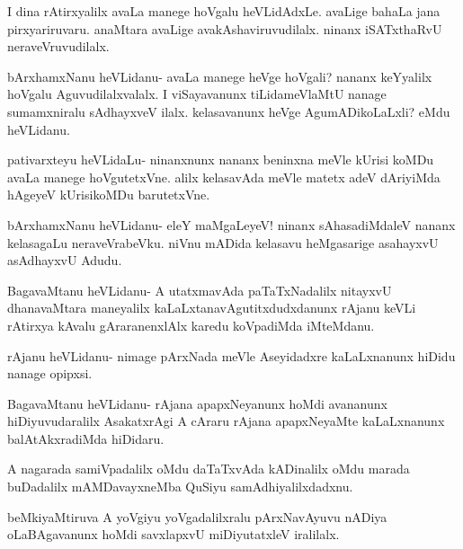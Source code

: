 \documentclass{article}
\begin{document}
\begin{mng}%
I dina rAtirxyalilx avaLa manege hoVgalu heVLidAdxLe. avaLige
bahaLa jana pirxyariruvaru. anaMtara avaLige avakAshaviruvudilalx. ninanx
iSATxthaRvU neraveVruvudilalx.
\end{mng}

\begin{mng}%
bArxhamxNanu heVLidanu- avaLa manege heVge hoVgali? nananx
keYyalilx hoVgalu Aguvudilalxvalalx. I viSayavanunx tiLidameVlaMtU nanage
sumamxniralu sAdhayxveV ilalx. kelasavanunx heVge AgumADikoLaLxli? eMdu
heVLidanu.
\end{mng}

\begin{mng}%
pativarxteyu heVLidaLu- ninanxnunx nananx beninxna meVle kUrisi
koMDu avaLa manege hoVgutetxVne. alilx kelasavAda meVle matetx
adeV dAriyiMda hAgeyeV kUrisikoMDu barutetxVne.
\end{mng}

\begin{mng}%
bArxhamxNanu heVLidanu- eleY maMgaLeyeV! ninanx sAhasadiMdaleV
nananx kelasagaLu neraveVrabeVku. niVnu mADida kelasavu heMgasarige
asahayxvU asAdhayxvU Adudu.
\end{mng}

\begin{mng}%
BagavaMtanu heVLidanu- A utatxmavAda paTaTxNadalilx nitayxvU
dhanavaMtara maneyalilx kaLaLxtanavAgutitxdudxdanunx rAjanu keVLi rAtirxya kAvalu
gAraranenxlAlx karedu koVpadiMda iMteMdanu.
\end{mng}

\begin{mng}%
rAjanu heVLidanu- nimage pArxNada meVle Aseyidadxre kaLaLxnanunx
hiDidu nanage opipxsi.
\end{mng}

\begin{mng}%
BagavaMtanu heVLidanu- rAjana apapxNeyanunx hoMdi avananunx
hiDiyuvudaralilx AsakatxrAgi A cAraru rAjana apapxNeyaMte kaLaLxnanunx
balAtAkxradiMda hiDidaru.
\end{mng}

\begin{mng}%
A nagarada samiVpadalilx oMdu daTaTxvAda kADinalilx oMdu marada
buDadalilx mAMDavayxneMba QuSiyu samAdhiyalilxdadxnu.
\end{mng}

\begin{mng}%
beMkiyaMtiruva A yoVgiyu yoVgadalilxralu pArxNavAyuvu
nADiya oLaBAgavanunx hoMdi savxlapxvU miDiyutatxleV iralilalx.
\end{mng}
\end{document}
